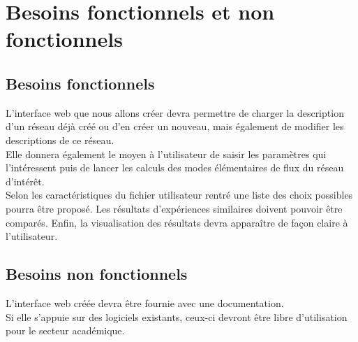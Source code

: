 \chapter{Besoins fonctionnels et non fonctionnels}

\section{Besoins fonctionnels}

L'interface web que nous allons créer devra permettre de charger la description d'un réseau déjà créé ou d'en créer un nouveau, mais également de modifier les descriptions de ce réseau.\\
Elle donnera également le moyen à l'utilisateur de saisir les paramètres qui l'intéressent puis de lancer les calculs des modes élémentaires de flux du réseau d'intérêt.\\
Selon les caractéristiques du fichier utilisateur rentré une liste des choix possibles pourra être proposé. Les résultats d'expériences similaires doivent pouvoir être comparés.
Enfin, la visualisation des résultats devra apparaître de façon claire à l'utilisateur.


\section{Besoins non fonctionnels}

L'interface web créée devra être fournie avec une documentation.\\
Si elle s'appuie sur des logiciels existants, ceux-ci devront être libre d'utilisation pour le secteur académique.